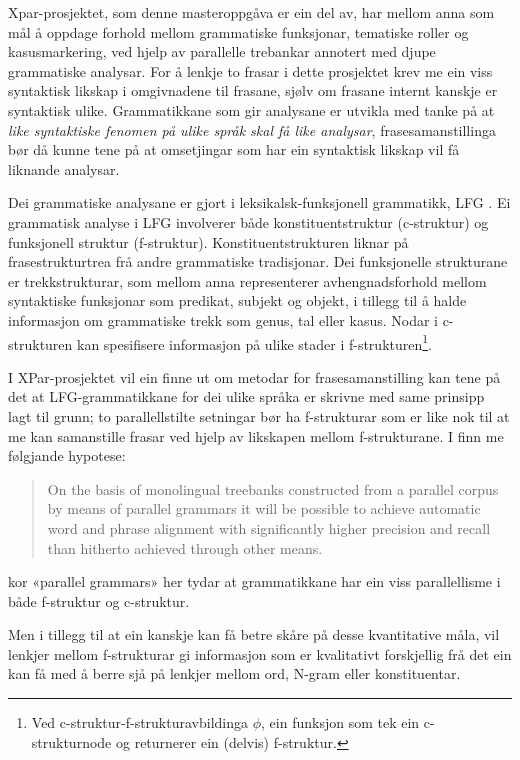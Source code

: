 \documentclass[11pt,a4paper,oneside,draft]{book}
\begin{document}
Xpar-prosjektet, som denne masteroppgåva er ein del av, har mellom
anna som mål å oppdage forhold mellom grammatiske funksjonar,
tematiske roller og kasusmarkering, ved hjelp av parallelle trebankar
annotert med djupe grammatiske analysar.  For å lenkje to frasar i
dette prosjektet krev me ein viss syntaktisk likskap i omgivnadene til
frasane, sjølv om frasane internt kanskje er syntaktisk ulike.
Grammatikkane som gir analysane er utvikla med tanke på at \emph{like syntaktiske fenomen på ulike språk skal få like analysar},
frasesamanstillinga bør då kunne tene på at omsetjingar som har ein
syntaktisk likskap vil få liknande analysar.

Dei grammatiske analysane er gjort i leksikalsk-funksjonell
grammatikk, LFG \citep{bresnan2001lfs}. Ei grammatisk analyse i LFG
involverer både konstituentstruktur (c-struktur) og funksjonell
struktur (f-struktur). Konstituentstrukturen liknar på
frasestrukturtrea frå andre grammatiske tradisjonar. Dei funksjonelle
strukturane er trekkstrukturar, som mellom anna representerer
avhengnadsforhold mellom syntaktiske funksjonar som predikat, subjekt
og objekt, i tillegg til å halde informasjon om grammatiske trekk som
genus, tal eller kasus. Nodar i c-strukturen kan spesifisere
informasjon på ulike stader i f-strukturen\footnote{Ved c-struktur-f-strukturavbildinga $\phi$, ein funksjon som
        tek ein c-strukturnode og returnerer ein (delvis) f-struktur. }.

I XPar-prosjektet vil ein finne ut om metodar for frasesamanstilling
kan tene på det at LFG-grammatikkane for dei ulike språka er skrivne
med same prinsipp lagt til grunn; to parallellstilte setningar bør ha
f-strukturar som er like nok til at me kan samanstille frasar ved
hjelp av likskapen mellom f-strukturane. I \citet[s.~72]{dyvik2009lmp}
finn me følgjande hypotese:

\begin{quote}
On the basis of monolingual treebanks constructed from a parallel
corpus by means of parallel grammars it will be possible to achieve
automatic word and phrase alignment with significantly higher
precision and recall than hitherto achieved through other means.
\end{quote}

kor «parallel grammars» her tydar at grammatikkane har ein viss
parallellisme i både f-struktur og c-struktur.

Men i tillegg til at ein kanskje kan få betre skåre på desse
kvantitative måla, vil lenkjer mellom f-strukturar gi informasjon som
er kvalitativt forskjellig frå det ein kan få med å berre sjå på
lenkjer mellom ord, N-gram eller konstituentar.
\end{document}
